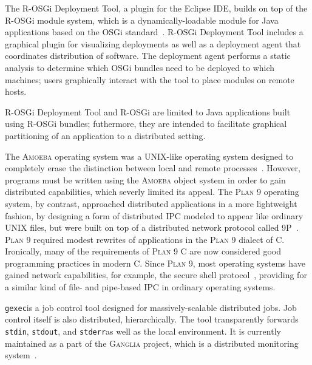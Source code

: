 \documentclass[11pt]{article}
\newcommand{\ninep}{\textsc{9P}\xspace}
\newcommand{\amoeba}{\textsc{Amoeba}\xspace}
\newcommand{\plannine}{\textsc{Plan 9}\xspace}
\newcommand{\rosgig}{R-OSGi Deployment Tool\xspace}
\newcommand{\rosgi}{R-OSGi\xspace}
\newcommand{\gexec}{\texttt{gexec}}
\newcommand{\ganglia}{\textsc{Ganglia}\xspace}
\newcommand{\stdin}{\texttt{stdin}}
\newcommand{\stdout}{\texttt{stdout}}
\newcommand{\stderr}{\texttt{stderr}}
\begin{document}
The \rosgig, a plugin for the Eclipse IDE, builds on top of the \rosgi module system, which is a dynamically-loadable module for Java applications based on the OSGi standard~\cite{10.5555/1785080.1785082, 10.1145/1328279.1328290}.   \rosgig includes a graphical plugin for visualizing deployments as well as a deployment agent that coordinates distribution of software.  The deployment agent performs a static analysis to determine which OSGi bundles need to be deployed to which machines; users graphically interact with the tool to place modules on remote hosts.

\rosgig and \rosgi are limited to Java applications built using \rosgi bundles; futhermore, they are intended to facilitate graphical partitioning of an application to a distributed setting.

The \amoeba operating system was a UNIX-like operating system designed to completely erase the distinction between local and remote processes~\cite{10.1109/2.53354}.  However, programs must be written using the \amoeba object system in order to gain distributed capabilities, which severly limited its appeal.  The \plannine operating system, by contrast, approached distributed applications in a more lightweight fashion, by designing a form of distributed IPC modeled to appear like ordinary UNIX files, but were built on top of a distributed network protocol called \ninep~\cite{DBLP:journals/csys/PikePDFTT95}.  \plannine required modest rewrites of applications in the \plannine dialect of C.  Ironically, many of the requirements of \plannine C are now considered good programming practices in modern C.  Since \plannine, most operating systems have gained network capabilities, for example, the secure shell protocol~\cite{10.5555/1267569.1267573}, providing for a similar kind of file- and pipe-based IPC in ordinary operating systems.

\gexec is a job control tool designed for massively-scalable distributed jobs.  Job control itself is also distributed, hierarchically.  The tool transparently forwards \stdin, \stdout, and \stderr as well as the local environment.  It is currently maintained as a part of the \ganglia project, which is a distributed monitoring system~\cite{MASSIE2004817}.
\end{document}
